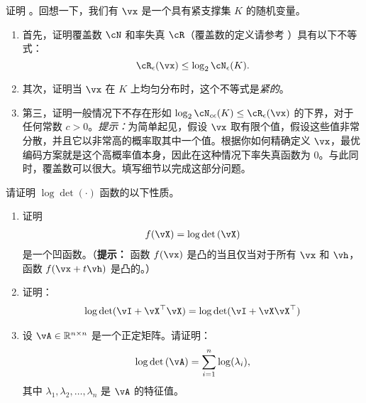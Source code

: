\documentclass[../../book-main_zh.tex]{subfiles}
\begin{document}
\begin{exercise}\label{exer:prop cover}
	证明 。回想一下，我们有 \(\vx\) 是一个具有紧支撑集 \(K\) 的随机变量。
	\begin{enumerate}
		\item 首先，证明覆盖数 \(\cN\) 和率失真 \(\cR\)（覆盖数的定义请参考 ）具有以下不等式：
		\begin{equation}
			\cR_{\epsilon}(\vx) \leq \log_{2} \cN_{\epsilon}(K).
		\end{equation}
		\item 其次，证明当 \(\vx\) 在 \(K\) 上均匀分布时，这个不等式是\textit{紧的}。
		\item 第三，证明一般情况下不存在形如 \(\log_{2} \cN_{c\epsilon}(K) \leq \cR_{\epsilon}(\vx)\) 的下界，对于任何常数 \(c > 0\)。\textit{提示：}为简单起见，假设 \(\vx\) 取有限个值，假设这些值非常分散，并且它以非常高的概率取其中一个值。根据你如何精确定义 \(\vx\)，最优编码方案就是这个高概率值本身，因此在这种情况下率失真函数为 \(0\)。与此同时，覆盖数可以很大。填写细节以完成这部分问题。
	\end{enumerate}
\end{exercise}

\begin{exercise}
	请证明 $\log\det(\cdot)$ 函数的以下性质。
	\begin{enumerate}
		\item 证明
		      \begin{align*}
			      f(\vX) = \log\det\left(\vX\right)
		      \end{align*}
		      是一个凹函数。（{\bf 提示：} 函数 $f(\vx)$ 是凸的当且仅当对于所有 $\vx$ 和 $\vh$，函数 $f(\vx+t\vh)$ 是凸的。）

		\item 证明：
		      \begin{align*}
			      \log\det(\vI + \vX^\top\vX) = \log\det(\vI + \vX\vX^\top)
		      \end{align*}

		\item 设 $\vA \in \R^{n\times n}$ 是一个正定矩阵。请证明：
		      \begin{align}
			      \log\det\left(\vA \right) = \sum_{i=1}^n \log(\lambda_i),
		      \end{align}
		      其中 $\lambda_1,\lambda_2,\dots,\lambda_n$ 是 $\vA$ 的特征值。
	\end{enumerate}

\end{exercise}


 
\end{document}
